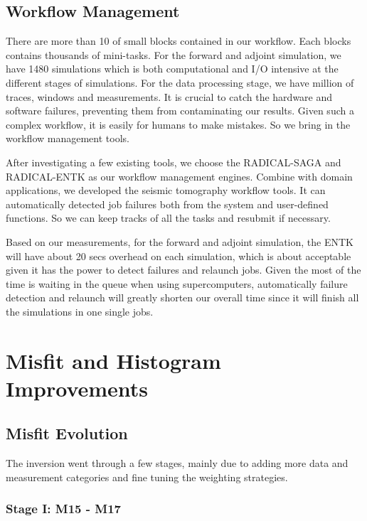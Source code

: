 \documentclass[extra,mreferee]{gji}
\begin{document}
\citep{krischer2016adaptable}

\subsection{Workflow Management}

There are more than 10 of small blocks contained in our workflow. Each blocks contains thousands of mini-tasks. For the forward and adjoint simulation, we have 1480 simulations which is both computational and I/O intensive at the different stages of simulations. For the data processing stage, we have million of traces, windows and measurements. It is crucial to catch the hardware and software failures, preventing them from contaminating our results. Given such a complex workflow, it is easily for humans to make mistakes. So we bring in the workflow management tools.

After investigating a few existing tools, we choose the RADICAL-SAGA and RADICAL-ENTK as our workflow management engines. Combine with domain applications, we developed the seismic tomography workflow tools. It can automatically detected job failures both from the system and user-defined functions. So we can keep tracks of all the tasks and resubmit if necessary.

Based on our measurements, for the forward and adjoint simulation, the ENTK will have about 20 secs overhead on each simulation, which is about acceptable given it has the power to detect failures and relaunch jobs. Given the most of the time is waiting in the queue when using supercomputers, automatically failure detection and relaunch will greatly shorten our overall time since it will finish all the simulations in one single jobs.


\section{Misfit and Histogram Improvements}

\subsection{Misfit Evolution}

The inversion went through a few stages, mainly due to adding more data
and measurement categories and fine tuning the weighting strategies.

\subsubsection{Stage I: M15 - M17}
\end{document}

